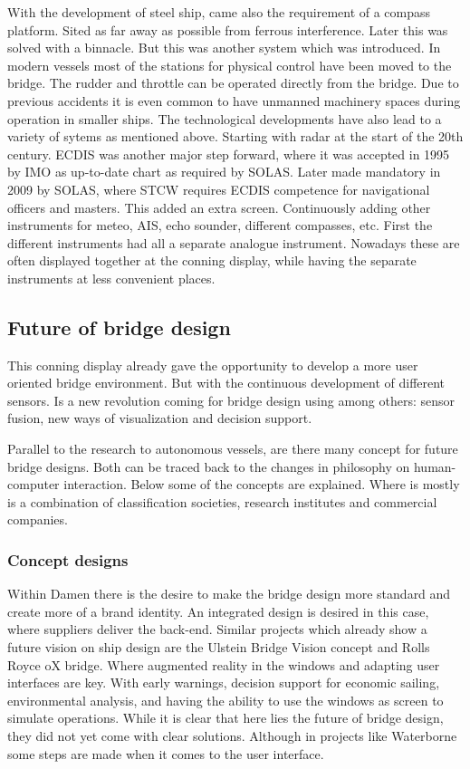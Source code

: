 With the development of steel ship, came also the requirement of a compass platform. Sited as far away as possible from ferrous interference. Later this was solved with a binnacle. But this was another system which was introduced. In modern vessels most of the stations for physical control have been moved to the bridge. The rudder and throttle can be operated directly from the bridge. Due to previous accidents it is even common to have unmanned machinery spaces during operation in smaller ships. The technological developments have also lead to a variety of sytems as mentioned above. Starting with radar at the start of the 20th century. \ac{ECDIS} was another major step forward, where it was accepted in 1995 by IMO as up-to-date chart as required by \ac{SOLAS}. Later made mandatory in 2009 by \ac{SOLAS}, where \ac{STCW} requires \ac{ECDIS} competence for navigational officers and masters. This added an extra screen. Continuously adding other instruments for meteo, \ac{AIS}, echo sounder, different compasses, etc. First the different instruments had all a separate analogue instrument. Nowadays these are often displayed together at the conning display, while having the separate instruments at less convenient places.

\subsection{Future of bridge design}
This conning display already gave the opportunity to develop a more user oriented bridge environment. But with the continuous development of different sensors. Is a new revolution coming for bridge design using among others: sensor fusion, new ways of visualization and decision support.

Parallel to the research to autonomous vessels, are there many concept for future bridge designs. Both can be traced back to the changes in philosophy on human-computer interaction. Below some of the concepts are explained. Where is mostly is a combination of classification societies, research institutes and commercial companies.

\subsubsection{Concept designs}
Within Damen there is the desire to make the bridge design more standard and create more of a brand identity. An integrated design is desired in this case, where suppliers deliver the back-end. Similar projects which already show a future vision on ship design are the Ulstein Bridge Vision concept and Rolls Royce oX bridge. Where augmented reality in the windows and adapting user interfaces are key. With early warnings, decision support for economic sailing, environmental analysis, and having the ability to use the windows as screen to simulate operations. While it is clear that here lies the future of bridge design, they did not yet come with clear solutions. Although in projects like Waterborne some steps are made when it comes to the user interface.\cite{RollsRoyce2015} \cite{Ulstein2013}

